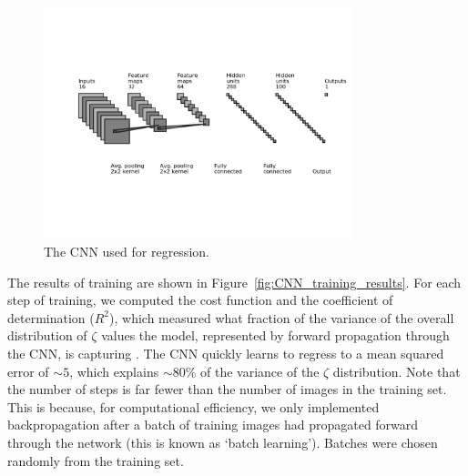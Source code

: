 \begin{figure}
\centering
\includegraphics[width=0.8\textwidth]{chapters/hera_ml/figures/my-cnn.png}
\caption{The CNN used for regression.}
\label{fig:my-cnn}
\end{figure}

The results of training are shown in Figure~\ref{fig:CNN_training_results}. For each step of training, we computed the cost function and the coefficient of determination ($R^2$), which measured what fraction of the variance of the overall distribution of $\zeta$ values the model, represented by forward propagation through the CNN, is capturing \citep[e.g.][]{Glantz.90}. The CNN quickly learns to regress to a mean squared error of $\sim 5$, which explains $\sim 80\%$ of the variance of the $\zeta$ distribution. Note that the number of steps is far fewer than the number of images in the training set. This is because, for computational efficiency, we only implemented backpropagation after a batch of training images had propagated forward through the network (this is known as `batch learning'). Batches were chosen randomly from the training set.

